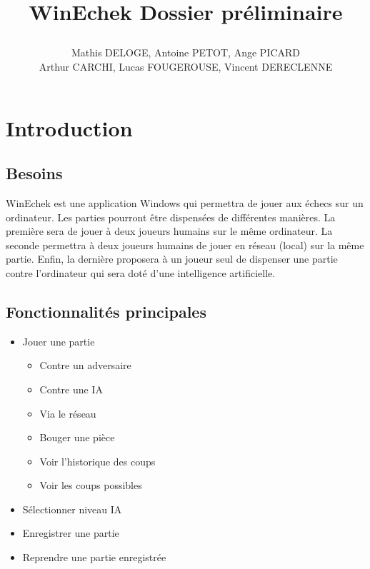 \documentclass{article}
\title{%
    \begin{minipage}\linewidth
        \centering \bfseries
	  WinEchek
        \vskip3pt
        \large Dossier préliminaire
    \end{minipage}
}
\author{Mathis DELOGE, Antoine PETOT, Ange PICARD\\Arthur CARCHI, Lucas FOUGEROUSE, Vincent DERECLENNE}
\date{}
\begin{document}
\renewcommand{\labelitemi}{$\bullet$}
\renewcommand{\labelitemii}{$\circ$}
\renewcommand{\labelitemiii}{$-$}
\renewcommand{\labelitemiv}{$\triangleright$}


\maketitle

\section{Introduction}
\subsection{Besoins}
WinEchek est une application Windows qui permettra de jouer aux échecs sur un ordinateur. Les parties pourront être dispensées de différentes manières. La première sera de jouer à deux joueurs humains sur le même ordinateur. La seconde permettra à deux joueurs humains de jouer en réseau (local) sur la même partie. Enfin, la dernière proposera à un joueur seul de dispenser une partie contre l'ordinateur qui sera doté d'une intelligence artificielle.

\subsection{Fonctionnalités principales}
\begin{itemize}
 \item Jouer une partie
 \begin{itemize}
  \item Contre un adversaire
  \item Contre une IA
  \item Via le réseau
  \item Bouger une pièce
  \item Voir l'historique des coups
  \item Voir les coups possibles
 \end{itemize}
 \item Sélectionner niveau IA
 \item Enregistrer une partie
 \item Reprendre une partie enregistrée
\end{itemize}
\end{document}
